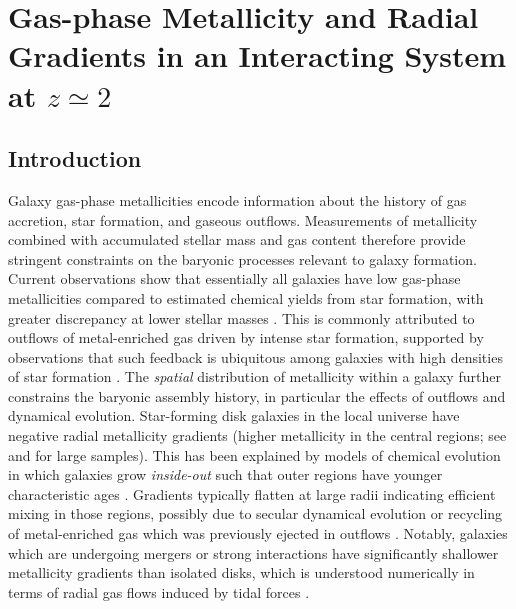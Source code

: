 
\chapter{Gas-phase Metallicity and Radial Gradients in an Interacting System at $z \simeq 2$}

\section{Introduction}\label{sec:intro}

Galaxy gas-phase metallicities encode information about the history of gas accretion, star formation, and gaseous
outflows. Measurements of metallicity combined with accumulated stellar mass and gas content therefore provide
stringent constraints on the baryonic processes relevant to galaxy formation. Current observations show that
essentially all galaxies have low gas-phase metallicities compared to estimated chemical yields from star
formation, with greater discrepancy at lower stellar masses \citep[the mass-metallicity relation,
e.g.,][]{Tremonti2004, Lequeux1979}. This is commonly attributed to outflows of metal-enriched gas driven by
intense star formation, supported by observations that such feedback is ubiquitous among galaxies with high
densities of star formation \citep{Heckman2001, Newman2012}.  The \emph{spatial} distribution of metallicity
within a galaxy further constrains the baryonic assembly history, in particular the effects of outflows and
dynamical evolution. Star-forming disk galaxies in the local universe have negative radial metallicity gradients
(higher metallicity in the central regions; see \citealt{Sanchez2014} and \citealt{Vila-Costas1992} for large
samples). This has been explained by models of chemical evolution in which galaxies grow \emph{inside-out} such
that outer regions have younger characteristic ages \citep[e.g.,][]{Nelson2012}. Gradients typically flatten at
large radii indicating efficient mixing in those regions, possibly due to secular dynamical evolution or
recycling of metal-enriched gas which was previously ejected in outflows \citep[so-called "galactic fountains";
e.g.][]{Werk2011, Bresolin2012}. Notably, galaxies which are undergoing mergers or strong interactions have
significantly shallower metallicity gradients than isolated disks, which is understood numerically in terms of
radial gas flows induced by tidal forces \citep{Rupke2010a, Rupke2010b, Sanchez2014, Rich2012}.

